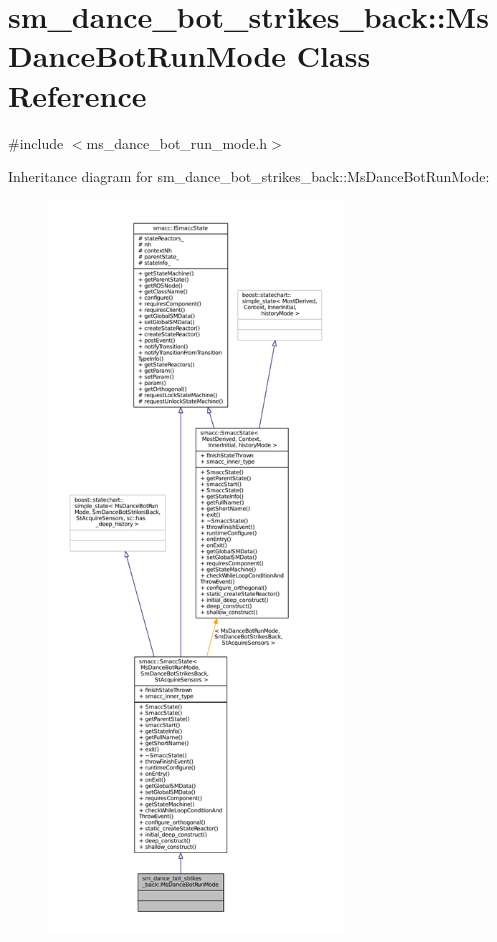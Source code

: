 \hypertarget{classsm__dance__bot__strikes__back_1_1MsDanceBotRunMode}{}\section{sm\+\_\+dance\+\_\+bot\+\_\+strikes\+\_\+back\+:\+:Ms\+Dance\+Bot\+Run\+Mode Class Reference}
\label{classsm__dance__bot__strikes__back_1_1MsDanceBotRunMode}


{\ttfamily \#include $<$ms\+\_\+dance\+\_\+bot\+\_\+run\+\_\+mode.\+h$>$}



Inheritance diagram for sm\+\_\+dance\+\_\+bot\+\_\+strikes\+\_\+back\+:\+:Ms\+Dance\+Bot\+Run\+Mode\+:
\nopagebreak
\begin{figure}[H]
\begin{center}
\leavevmode
\includegraphics[height=550pt]{classsm__dance__bot__strikes__back_1_1MsDanceBotRunMode__inherit__graph}
\end{center}
\end{figure}


